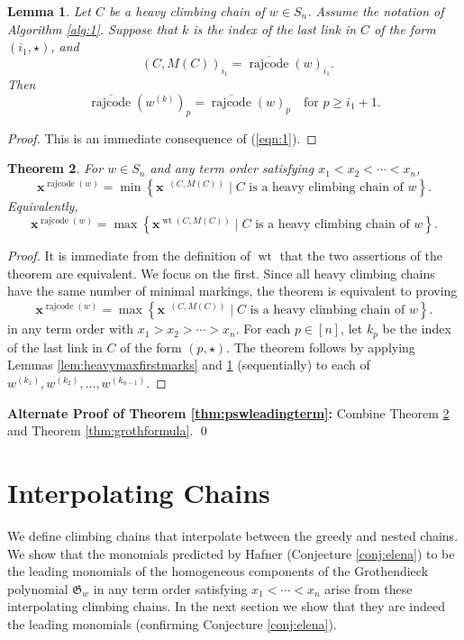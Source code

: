 \documentclass[11pt]{amsart}
\newtheorem{theorem}{Theorem}[section]
\newtheorem{lemma}[theorem]{Lemma}
\theoremstyle{definition}
\theoremstyle{named}
\DeclareMathOperator{\rr}{\mathrm{rajcode}} %
\newcommand{\orr}{\overline{\rr}} %
\DeclareMathOperator{\wt}{\mathrm{wt}}
\DeclareMathOperator{\dwt}{\overline{\mathrm{wt}}}
\begin{document}
	\begin{lemma}
		\label{lem:heavyequalitycase}
		Let $C$ be a heavy climbing chain of $w\in S_n$. Assume the notation of Algorithm \ref{alg:1}. 
		Suppose that $k$ is the index of the last link in $C$ of the form $(i_1,\star)$, and
		\[\dwt(C,M(C))_{i_1}= \orr(w)_{i_1}. \]
		Then
		\[
			\orr(w^{(k)})_p = \orr(w)_p \quad\mbox{for } p\geq i_1+1. 
		\]
	\end{lemma}
	\begin{proof}
		This is an immediate consequence of (\ref{eqn:1}).
	\end{proof}

	\begin{theorem}
		\label{thm:leadingchainweight}
		For $w\in S_n$ and any term order satisfying $x_1<x_2<\cdots<x_n$,
		\[\bm{x}^{\orr(w)} = \min \left\{\bm{x}^{\dwt(C,M(C))} \mid C \mbox{ is a heavy climbing chain of } w \right\}. \] 
		Equivalently,
		\[\bm{x}^{\rr(w)} = \max \left\{\bm{x}^{\wt(C,M(C))} \mid C \mbox{ is a heavy climbing chain of } w \right\}. \] 
	\end{theorem}
	\begin{proof}
		It is immediate from the definition of $\wt$ that the two assertions of the theorem are equivalent. We focus on the first. Since all heavy climbing chains have the same number of minimal markings, the theorem is equivalent to proving 
		\[\bm{x}^{\orr(w)} = \max \left\{\bm{x}^{\dwt(C,M(C))} \mid C \mbox{ is a heavy climbing chain of } w \right\}. \] 
		in any term order with $x_1>x_2>\cdots>x_n$. 
		For each $p\in[n]$, let $k_p$ be the index of the last link in $C$ of the form $(p,\star)$. The theorem follows by applying Lemmas \ref{lem:heavymaxfirstmarks} and \ref{lem:heavyequalitycase} (sequentially) to each of $w^{(k_1)},w^{(k_2)},\ldots,w^{(k_{n-1})}$.
	\end{proof}
	
	\noindent \textbf{Alternate Proof of 	Theorem \ref{thm:pswleadingterm}:} 
	Combine Theorem \ref{thm:leadingchainweight} and Theorem \ref{thm:grothformula}. \qed 
	
	\section{Interpolating Chains}
	\label{sec:inter}
	
	We define climbing chains that interpolate between the greedy and nested chains. We show that the monomials predicted by Hafner (Conjecture \ref{conj:elena}) to be the leading monomials of the homogeneous components of the Grothendieck polynomial $\mathfrak{G}_w$ in any term order satisfying $x_1<\cdots<x_n$ arise from these interpolating climbing chains. In the next section we show that they are indeed the leading monomials (confirming Conjecture \ref{conj:elena}).
	
\end{document}
